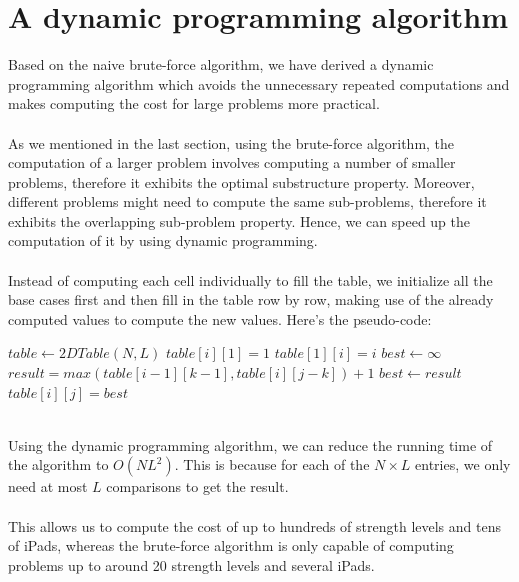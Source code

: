 \documentclass[12pt,a4paper,oneside]{report}
\begin{document}
\section{A dynamic programming algorithm}
Based on the naive brute-force algorithm, we have derived a dynamic programming algorithm which avoids the unnecessary repeated computations and makes computing the cost for large problems more practical. \\\\
As we mentioned in the last section, using the brute-force algorithm, the computation of a larger problem involves computing a number of smaller problems, therefore it exhibits the optimal substructure property. Moreover, different problems might need to compute the same sub-problems, therefore it exhibits the overlapping sub-problem property. Hence, we can speed up the computation of it by using dynamic programming. \\\\
Instead of computing each cell individually to fill the table, we initialize all the base cases first and then fill in the table row by row, making use of the already computed values to compute the new values. Here's the pseudo-code:
\begin{algorithm}
\caption{$makeTable(N, L)$}
\begin{algorithmic}[1]
\STATE $table \leftarrow 2DTable(N, L)$
	\STATE $table[i][1] = 1$
\ENDFOR
{}
	\STATE $table[1][i] = i$
\ENDFOR
{}
		\STATE $best \leftarrow \infty$
			\STATE $result = max(table[i - 1][k - 1], table[i][j - k])+1$
				\STATE $best \leftarrow result$
			\ENDIF
		\ENDFOR
		\STATE $table[i][j] = best$
	\ENDFOR
\ENDFOR
\end{algorithmic}
\end{algorithm}
~\\
Using the dynamic programming algorithm, we can reduce the running time of the algorithm to $O(NL^2)$. This is because for each of the $N \times L$ entries, we only need at most $L$ comparisons to get the result. \\\\
This allows us to compute the cost of up to hundreds of strength levels and tens of iPads, whereas the brute-force algorithm is only capable of computing problems up to around 20 strength levels and several iPads.
\end{document}
